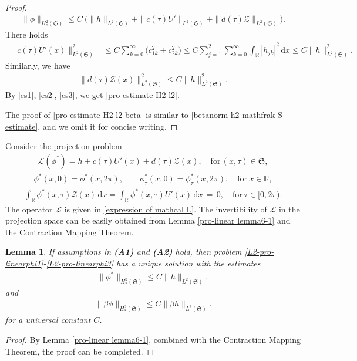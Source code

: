 \documentclass[10pt, reqno]{amsart}
\numberwithin{equation}{section}
\newtheorem{lemma}[theorem]{Lemma}
\theoremstyle{definition}
\begin{document}
{{\begin{proof}
\begin{align}
 \|\phi\|_{H^2_*(\mathfrak S)} \leq C\ \Big( \|h\|_{L^2(\mathfrak S)} + \|c(\tau) U'\|_{L^2(\mathfrak S)} +\| d(\tau){\mathcal Z}\|_{L^2(\mathfrak S)} \Big).
\end{align}
There holds
\begin{align} \label{es2}
 \|c(\tau) U'(x)\|_{L^2(\mathfrak S)}^2
 & \leq C \sum_{k=0}^\infty \Big(c_{1k}^2+ c_{2k}^2\Big)
 \leq C \sum_{j=1}^2\sum_{k=0}^\infty \int_{\mathbb R}|h_{jk}|^2 \,{\mathrm d}x \leq C\|h\|^2_{L^2(\mathfrak S)}.
\end{align}
 Similarly, we have
\begin{align} \label{es3}
 \|d(\tau){\mathcal Z}(x)\|_{L^2(\mathfrak S)}^2 \leq C\|h\|^2_{L^2(\mathfrak S)}.
\end{align}
By \eqref{es1}, \eqref{es2}, \eqref{es3}, we get \eqref{pro estimate H2-l2}.

The proof of \eqref{pro estimate H2-l2-beta} is similar to \eqref{betanorm h2 mathfrak S estimate}, and we omit it for concise writing.
\end{proof}

\medskip
 Consider the projection problem
\begin{align} \label{L2-pro-linearphi1}
 \mathcal L (\phi^*) = h+c(\tau) U'(x)+ d(\tau){\mathcal Z}(x),
 \quad \text{for}\,(x, \tau)\in \mathfrak S,
\end{align}
\begin{align}
 \phi^*(x, 0) = \phi^*(x, 2\pi), \qquad \phi^*_\tau(x, 0) = \phi^*_\tau(x, 2\pi), \quad \text{for}~x\in {\mathbb R},
\end{align}
\begin{align} \label{L2-pro-linearphi3}
 \int_{\mathbb R}\phi^*(x,\tau){\mathcal Z}(x) \,{\mathrm d}x = \int_{\mathbb R}\phi^*(x,\tau) U'(x)\,{\mathrm d}x \,=\, 0, \quad \text{for}~\tau\in [0, 2\pi).
\end{align}
The operator $\mathcal L$ is given in \eqref{expression of mathcal L}.
The invertibility of $\mathcal L$ in the projection space can be easily obtained from Lemma \ref{pro-linear lemma6-1}
and the Contraction Mapping Theorem.

\begin{lemma} \label{pro-linear lemma6-1-mathcal L}
If assumptions in {\bf{(A1)}} and {\bf{(A2)}} hold, then problem \eqref{L2-pro-linearphi1}-\eqref{L2-pro-linearphi3} has a unique solution with the estimates
\begin{align} \label{pro estimate H2-l2-mathcal}
 \|\phi^*\|_{H^2_*(\mathfrak S)} \leq C \|h\|_{L^2(\mathfrak S)},
\end{align}
and
\begin{align} \label{pro estimate H2-l2-mathcal-beta}
 \|\beta\phi\|_{H^2_*(\mathfrak S)} \leq C \|\beta h\|_{L^2(\mathfrak S)}.
\end{align}
for a universal constant $C$.
\end{lemma}
\begin{proof}
By Lemma \ref{pro-linear lemma6-1}, combined with the Contraction Mapping Theorem, the proof can be completed.
\end{proof}



}}
\end{document}
